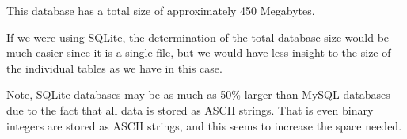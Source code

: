 This database has a total size of approximately 450 Megabytes. 

If we were using SQLite, the determination of the total database size would be
much easier since it is a single file, but we would have less insight to the
size of the individual tables as we have in this case. 

Note, SQLite databases may be as much as 50\% larger than MySQL databases due
to the fact that all data is stored as ASCII strings. That is even binary
integers are stored as ASCII strings, and this seems to increase the space
needed. 
